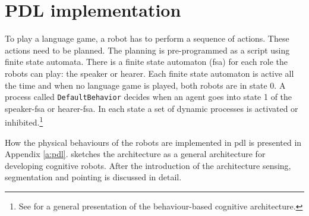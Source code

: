 \section{PDL implementation}

To play a language game, a robot has to perform a sequence of actions. These actions need to be planned. The planning is pre-programmed as a script using finite state automata. There is a finite state automaton ({\sc fsa}) for each role the robots can play: the speaker or hearer. Each finite state automaton is active all the time and when no language game is played, both robots are in state 0. A process called \texttt{DefaultBehavior} decides when an agent goes into state 1 of the speaker-{\sc fsa} or hearer-{\sc fsa}. In each state a set of dynamic processes is activated or inhibited.\footnote{See  for a general presentation of the behaviour-based cognitive architecture.}

How the physical behaviours of the robots are implemented in {\sc pdl} is presented in Appendix \ref{a:pdl}.  sketches the architecture as a general architecture for developing cognitive robots. After the introduction of the architecture sensing, segmentation and pointing is discussed in detail.

